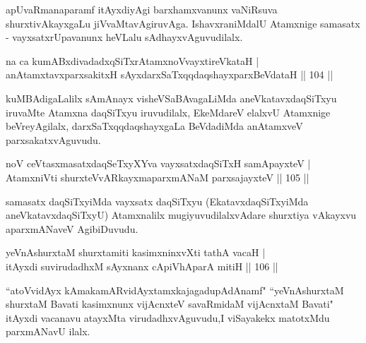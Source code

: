\begin{artha}
apUvaRmanaparamf itAyxdiyAgi barxhamxvanunx vaNiRsuva shurxtivAkayxgaLu jiVvaMtavAgiruvAga. IshavxraniMdalU Atamxnige samasatx - vayxsatxrUpavanunx heVLalu sAdhayxvAguvudilalx.
\end{artha}


\begin{shl}
na ca kumABxdivadadxqSiTxrAtamxnoV\s vayxtireVkataH |\\
anAtamxtavxparxsakitxH sAyxdarxSaTxqqdaqshayxparxBeVdataH \hfill || 104 ||
\end{shl}

\begin{artha}
kuMBAdigaLalilx sAmAnayx visheVSaBAvagaLiMda aneVkatavxdaqSiTxyu iruvaMte Atamxna daqSiTxyu iruvudilalx, EkeMdareV elalxvU Atamxnige beVreyAgilalx, darxSaTxqq\ndash daqshayxgaLa BeVdadiMda anAtamxveV parxsakatxvAguvudu.
\end{artha}


\begin{shl}
noV ceVtasxmasatxdaqSeTxyXYva vayxsatxdaqSiTxH samApayxteV |\\
AtamxniVti shurxteVvARkayxmaparxmANaM parxsajayxteV \hfill || 105 ||
\end{shl}

\begin{artha}
samasatx daqSiTxyiMda vayxsatx daqSiTxyu (EkatavxdaqSiTxyiMda aneVkatavxdaqSiTxyU) Atamxnalilx mugiyuvudilalxvAdare shurxtiya vAkayxvu aparxmANaveV AgibiDuvudu.
\end{artha}

\begin{shl}
yeVnAshurxtaM shurxtamiti kasimxninxvXti tathA vacaH |\\
itAyxdi suvirudadhxM sAyxnanx cApiVhAparA mitiH \hfill || 106 ||
\end{shl}

\begin{artha}
``atoVvidAyx kAmakamARvidAyxtamxkajagadupAdAnamf" ``yeVnAshurxtaM shurxtaM Bavati  kasimxnunx vijAcnxteV savaRmidaM vijAcnxtaM Bavati" itAyxdi vacanavu atayxMta virudadhxvAguvudu,I viSayakekx matotxMdu 
parxmANavU ilalx.
\end{artha}


